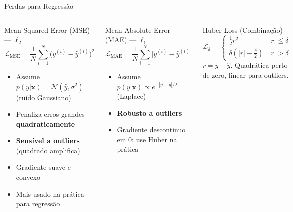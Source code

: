 \documentclass[7pt, aspectratio=169,10pt]{beamer}
\newcommand{\bx}{\bm{x}}
\begin{document}
\begin{frame}{Perdas para Regressão}
\begin{columns}[T]
\begin{block}{Mean Squared Error (MSE) — $\ell_2$}
\[
\mathcal{L}_{\text{MSE}} = \frac{1}{N}\sum_{i=1}^N \bigl(y^{(i)}-\hat{y}^{(i)}\bigr)^2
\]
\small
\begin{itemize}
  \item Assume $p(y|\bx) = \mathcal{N}(\hat{y},\sigma^2)$ (ruído Gaussiano)
  \item Penaliza erros grandes \textbf{quadraticamente}
  \item \textbf{Sensível a outliers} (quadrado amplifica)
  \item Gradiente suave e convexo
  \item Mais usado na prática para regressão
\end{itemize}
\end{block}
\begin{block}{Mean Absolute Error (MAE) — $\ell_1$}
\[
\mathcal{L}_{\text{MAE}} = \frac{1}{N}\sum_{i=1}^N \bigl|y^{(i)}-\hat{y}^{(i)}\bigr|
\]
\small
\begin{itemize}
  \item Assume $p(y|\bx) \propto e^{-|y-\hat{y}|/\lambda}$ (Laplace)
  \item \textbf{Robusto a outliers}
  \item Gradiente descontinuo em $0$: use Huber na prática
\end{itemize}
\end{block}
\begin{block}{Huber Loss (Combinação)}
\[
\mathcal{L}_\delta = \begin{cases} \tfrac{1}{2}r^2 & |r|\leq\delta \\ \delta(|r|-\tfrac{\delta}{2}) & |r|>\delta \end{cases}
\]
\small $r = y-\hat{y}$. Quadrática perto de zero, linear para outliers.
\end{block}
\end{columns}
\end{frame}
\end{document}
